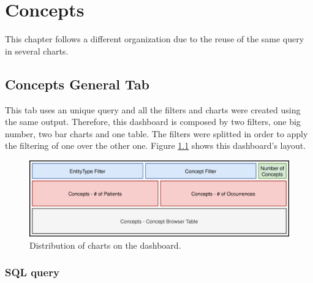 \documentclass[]{book}
\begin{document}
\chapter{Concepts}\label{concepts}

This chapter follows a different organization due to the reuse of the
same query in several charts.

\section{Concepts General Tab}\label{concepts-general-tab}

This tab uses an unique query and all the filters and charts were
created using the same output. Therefore, this dashboard is composed by
two filters, one big number, two bar charts and one table. The filters
were splitted in order to apply the filtering of one over the other one.
Figure \ref{fig:conceptsGeneralLayout} shows this dashboard's layout.

\begin{figure}
\includegraphics[width=1\linewidth]{images/conceptsGeneralLayout} \caption{Distribution of charts on the dashboard.}\label{fig:conceptsGeneralLayout}
\end{figure}

\subsection{SQL query}\label{sql-query-16}
\end{document}

